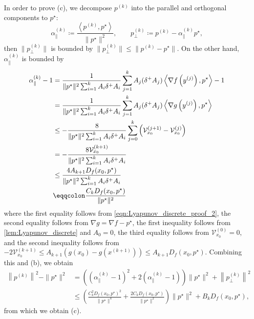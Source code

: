 \documentclass[11pt,a4paper]{article}
\theoremstyle{definition}
\theoremstyle{plain}
\begin{document}
    In order to prove (c), we decompose $p^{(k)}$ into the parallel and orthogonal components to $p^\star$:
    \begin{equation}\label{eqn:Lyapunov_discrete_proof_4}
        \alpha_\parallel^{(k)} \coloneqq \frac{\left\langle p^{(k)}, p^\star\right\rangle}{\|p^\star\|^2},\qquad p_\perp^{(k)} \coloneqq p^{(k)} - \alpha_\parallel^{(k)}p^\star,
    \end{equation}
    then $\|p_\perp^{(k)}\|$ is bounded by $\|p_\perp^{(k)}\| \le \|p^{(k)} - p^\star\|$.
    On the other hand, $\alpha_\parallel^{(k)}$ is bounded by
    \begin{align}
        \alpha_\parallel^{(k)} - 1
        &= \frac1{\|p^\star\|^2\sum_{i = 1}^kA_i\delta^+A_i}\sum_{j = 1}^kA_j(\delta^+A_j)\left\langle\nabla f\left(y^{(j)}\right), p^\star\right\rangle - 1\notag\\
        &= \frac1{\|p^\star\|^2\sum_{i = 1}^kA_i\delta^+A_i}\sum_{j = 1}^kA_j(\delta^+A_j)\left\langle\nabla g\left(y^{(j)}\right), p^\star\right\rangle\notag\\
        &\le -\frac8{\|p^\star\|^2\sum_{i = 1}^kA_i\delta^+A_i}\sum_{j = 0}^k\left(\mathcal{V}_{x_0}^{(j + 1)} - \mathcal{V}_{x_0}^{(j)}\right)\notag\\
        &= -\frac{8\mathcal{V}_{x_0}^{(k + 1)}}{\|p^\star\|^2\sum_{i = 1}^kA_i\delta^+A_i}\notag\\
        &\le \frac{4A_{k + 1}D_f(x_0, p^\star)}{\|p^\star\|^2\sum_{i = 1}^kA_i\delta^+A_i}\label{eqn:Lyapunov_discrete_proof_5}\\
        &\eqqcolon \frac{C_kD_f(x_0, p^\star)}{\|p^\star\|^2}\notag
    \end{align}
    where the first equality follows from \eqref{eqn:Lyapunov_discrete_proof_2}, the second equality follows from $\nabla g = \nabla f - p^\star$, the first inequality follows from \cref{lem:Lyapunov_discrete} and $A_0 = 0$, the third equality follows from $\mathcal{V}_{x_0}^{(0)} = 0$, and the second inequality follows from $-2\mathcal{V}_{x_0}^{(k + 1)} \le A_{k + 1}\left(g(x_0) - g(x^{(k + 1)})\right) \le A_{k + 1}D_f(x_0, p^\star)$.
    Combining this and (b), we obtain
    \begin{align*}
        \left\|p^{(k)}\right\|^2 - \|p^\star\|^2
        &= \left(\left(\alpha_\parallel^{(k)} - 1\right)^2 + 2\left(\alpha_\parallel^{(k)} - 1\right)\right)\|p^\star\|^2 + \left\|p_\perp^{(k)}\right\|^2\\
        &\le \left(\frac{C_k^2D_f(x_0, p^\star)^2}{\|p^\star\|^4} + \frac{2C_kD_f(x_0, p^\star)}{\|p^\star\|^2}\right)\|p^\star\|^2 + B_kD_f(x_0, p^\star),
    \end{align*}
    from which we obtain (c).
\end{document}
